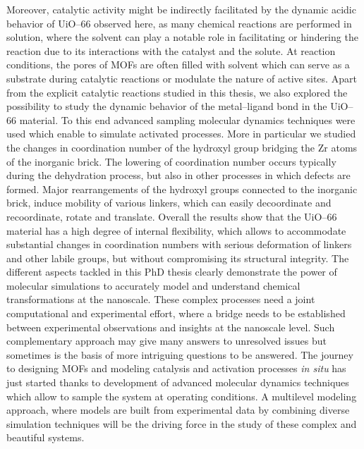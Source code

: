 Moreover, catalytic activity might be indirectly facilitated by the dynamic
acidic behavior of UiO--66 observed here, as many chemical reactions are performed in solution, where the solvent can play a notable role in facilitating or hindering the reaction due to its interactions with the catalyst and the solute. At reaction conditions, the pores of MOFs are often filled with solvent which can serve as a substrate during catalytic reactions or modulate the nature of active sites.
\npar
Apart from the explicit catalytic reactions studied in this thesis, we also
explored the possibility to study the dynamic behavior of the metal--ligand bond
in the UiO--66 material. To this end advanced sampling molecular dynamics techniques were used which enable to simulate activated processes. More in particular we studied the changes in coordination number of the hydroxyl group bridging the Zr atoms of the inorganic brick. The lowering of coordination number occurs typically during the dehydration process, but also in other processes in which defects are formed. Major rearrangements of the hydroxyl groups connected to the inorganic brick, induce mobility of various linkers, which can easily decoordinate and recoordinate, rotate and translate. Overall the results show that the UiO--66 material has a high degree of internal flexibility, which allows to accommodate substantial changes in coordination numbers with serious deformation of linkers and other labile groups, but without compromising its structural integrity.
\npar
The different aspects tackled in this PhD thesis clearly demonstrate the power
of molecular simulations to accurately model and understand chemical
transformations at the nanoscale. These complex processes need a joint
computational and experimental effort, where a bridge needs to be established
between experimental observations and insights at the nanoscale level. 
Such complementary approach may give many answers to unresolved issues but
sometimes is the basis of more intriguing questions to be answered. 
The journey to designing MOFs and modeling catalysis and activation processes
\textit{in situ} has just started thanks to development of advanced molecular
dynamics techniques which allow to sample the system at operating conditions. A multilevel modeling approach, where models are built from experimental data by combining diverse simulation techniques will be the driving force in the study of these complex and beautiful systems.

